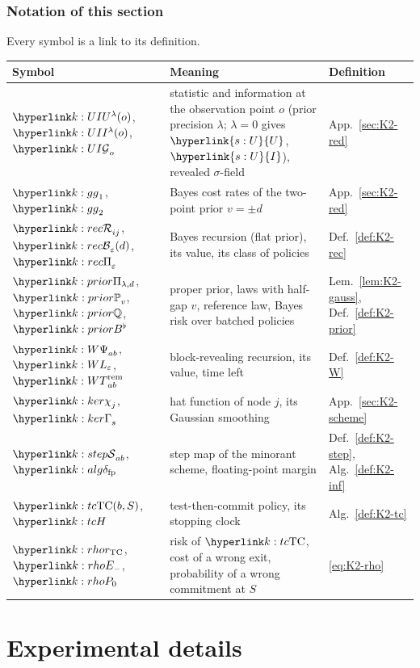 \documentclass[11pt]{article}
\DeclareRobustCommand{\sy}[2]{{\hyperlink{#1}{#2}}}
\newcommand{\1}{\mathbf{1}}
\newcommand{\Ud}{\sy{s:U}{U}}
\newcommand{\Id}{\sy{s:U}{I}}
\begin{document}
\subsubsection*{Notation of this section}
Every symbol is a link to its definition.\par\smallskip
{\small
\begin{tabular}{p{3.4cm} p{8.2cm} p{3.0cm}}
\hline
Symbol & Meaning & Definition\\ \hline
$\kU(o)$, $\kI(o)$, $\kF_o$ & statistic and information at the observation point $o$ (prior precision $\lambda$; $\lambda=0$ gives $\Ud$, $\Id$), revealed $\sigma$-field & App.~\ref{sec:K2-red}\\
$\kg_1$, $\kg_2$ & Bayes cost rates of the two-point prior $v=\pm d$ & App.~\ref{sec:K2-red}\\
$\kR_{ij}$, $\kB_\varepsilon(d)$, $\kPi_\varepsilon$ & Bayes recursion (flat prior), its value, its class of policies & Def.~\ref{def:K2-rec}\\
$\kPri$, $\kP{v}$, $\kQ$, $\kBb$ & proper prior, laws with half-gap $v$, reference law, Bayes risk over batched policies & Lem.~\ref{lem:K2-gauss}, Def.~\ref{def:K2-prior}\\
$\kW_{ab}$, $\kL$, $\kT_{ab}$ & block-revealing recursion, its value, time left & Def.~\ref{def:K2-W}\\
$\kchi_j$, $\kGam_s$ & hat function of node $j$, its Gaussian smoothing & App.~\ref{sec:K2-scheme}\\
$\kS_{ab}$, $\kdfp$ & step map of the minorant scheme, floating-point margin & Def.~\ref{def:K2-step}, Alg.~\ref{def:K2-inf}\\
$\kTC(b,S)$, $\kH$ & test-then-commit policy, its stopping clock & Alg.~\ref{def:K2-tc}\\
$\kr$, $\kEm$, $\kPo$ & risk of $\kTC$, cost of a wrong exit, probability of a wrong commitment at $S$ & \eqref{eq:K2-rho}\\
\hline
\end{tabular}}

\section{Experimental details}\label{sec:app-exp}
\end{document}
